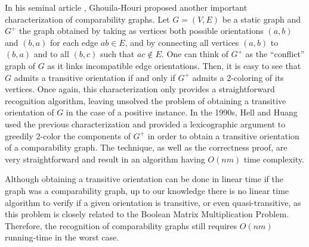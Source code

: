\documentclass[runningheads]{llncs}
\begin{document}
In his seminal article \cite{GhouilaHouri}, Ghouila-Houri proposed another important characterization of comparability graphs. Let $G=(V,E)$ be a static graph and $G^+$ the graph obtained by taking as vertices both possible orientations $(a,b)$ and $(b,a)$ for each edge $ab \in E$, and by connecting all vertices $(a,b)$ to $(b,a)$ and to all $(b,c)$ such that $ac \notin E$. One can think of $G^+$ as the \enquote{conflict} graph of $G$ as it links incompatible edge orientations. Then, it is easy to see that $G$ admits a transitive orientation if and only if $G^+$ admits a 2-coloring of its vertices. Once again, this characterization only provides a straightforward recognition algorithm,  leaving unsolved the problem of obtaining a transitive orientation of $G$ in the case of a positive instance. In the 1990s, Hell and Huang \cite{hell1995lexicographic} used the previous characterization and provided a lexicographic argument to greedily 2-color the components of $G^+$ in order to obtain a transitive orientation of a comparability graph. The technique, as well as the correctness proof, are very straightforward and result in an algorithm having $O(nm)$ time complexity.

Although obtaining a transitive orientation can be done in linear time if the graph was a comparability graph, up to our knowledge there is no linear time algorithm to verify if a given orientation is transitive, or even quasi-transitive, as this problem is closely related to the Boolean Matrix Multiplication Problem. Therefore, the recognition of comparability graphs still requires $O(nm)$ running-time in the worst case.
\end{document}

